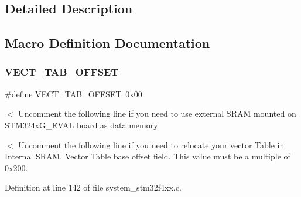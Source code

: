 \subsection{Detailed Description}


\subsection{Macro Definition Documentation}
\mbox{\label{group___s_t_m32_f4xx___system___private___defines_ga40e1495541cbb4acbe3f1819bd87a9fe}} 
\subsubsection{\texorpdfstring{V\+E\+C\+T\+\_\+\+T\+A\+B\+\_\+\+O\+F\+F\+S\+ET}{VECT\_TAB\_OFFSET}}
{\footnotesize\ttfamily \#define V\+E\+C\+T\+\_\+\+T\+A\+B\+\_\+\+O\+F\+F\+S\+ET~0x00}

$<$ Uncomment the following line if you need to use external S\+R\+AM mounted on S\+T\+M324x\+G\+\_\+\+E\+V\+AL board as data memory

$<$ Uncomment the following line if you need to relocate your vector Table in Internal S\+R\+AM. Vector Table base offset field. This value must be a multiple of 0x200. 

Definition at line 142 of file system\+\_\+stm32f4xx.\+c.

